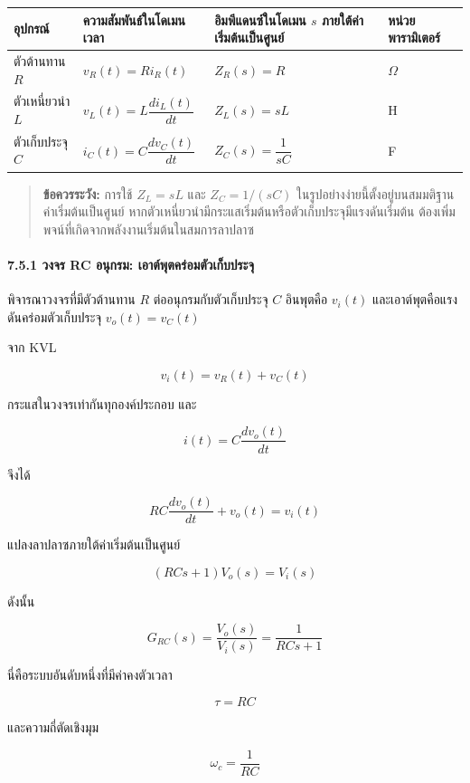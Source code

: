 \begin{table}[htbp]
    \centering
    \begin{tabular}{l l l l}
        \hline
        \textbf{อุปกรณ์} & \textbf{ความสัมพันธ์ในโดเมนเวลา} & \textbf{อิมพีแดนซ์ในโดเมน $s$ ภายใต้ค่าเริ่มต้นเป็นศูนย์} & \textbf{หน่วยพารามิเตอร์} \\
        \hline
        ตัวต้านทาน $R$ & $v_R(t)=Ri_R(t)$ & $Z_R(s)=R$ & $\Omega$ \\
        ตัวเหนี่ยวนำ $L$ & $v_L(t)=L\dfrac{di_L(t)}{dt}$ & $Z_L(s)=sL$ & H \\
        ตัวเก็บประจุ $C$ & $i_C(t)=C\dfrac{dv_C(t)}{dt}$ & $Z_C(s)=\dfrac{1}{sC}$ & F \\
        \hline
    \end{tabular}
\end{table}

\begin{quote}
\textbf{ข้อควรระวัง:} การใช้ $Z_L=sL$ และ $Z_C=1/(sC)$ ในรูปอย่างง่ายนี้ตั้งอยู่บนสมมติฐานค่าเริ่มต้นเป็นศูนย์ หากตัวเหนี่ยวนำมีกระแสเริ่มต้นหรือตัวเก็บประจุมีแรงดันเริ่มต้น ต้องเพิ่มพจน์ที่เกิดจากพลังงานเริ่มต้นในสมการลาปลาซ
\end{quote}

\paragraph{7.5.1 วงจร RC อนุกรม: เอาต์พุตคร่อมตัวเก็บประจุ}

พิจารณาวงจรที่มีตัวต้านทาน $R$ ต่ออนุกรมกับตัวเก็บประจุ $C$ อินพุตคือ $v_i(t)$ และเอาต์พุตคือแรงดันคร่อมตัวเก็บประจุ $v_o(t)=v_C(t)$

จาก KVL

\[
v_i(t)=v_R(t)+v_C(t)
\]

กระแสในวงจรเท่ากันทุกองค์ประกอบ และ

\[
i(t)=C\frac{dv_o(t)}{dt}
\]

จึงได้

\[
RC\frac{dv_o(t)}{dt}+v_o(t)=v_i(t)
\]

แปลงลาปลาซภายใต้ค่าเริ่มต้นเป็นศูนย์

\[
(RCs+1)V_o(s)=V_i(s)
\]

ดังนั้น

\[
\boxed{G_{RC}(s)=\frac{V_o(s)}{V_i(s)}=\frac{1}{RCs+1}}
\]

นี่คือระบบอันดับหนึ่งที่มีค่าคงตัวเวลา

\[
\tau=RC
\]

และความถี่ตัดเชิงมุม

\[
\omega_c=\frac{1}{RC}
\]

